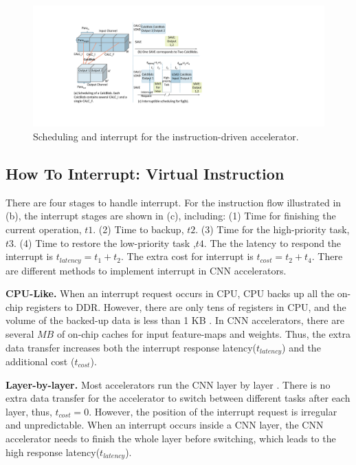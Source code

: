 \begin{figure}[t]
 \centering
	\includegraphics[width=0.99\linewidth]{fig/singlesave.pdf} 	
 \caption{
		Scheduling and interrupt for the instruction-driven accelerator.
 }
	\label{fig:singlesave}
\end{figure}

\subsection{How To Interrupt: Virtual Instruction}
\label{sec:howinter}

There are four stages to handle interrupt. For the instruction flow illustrated in (b), the interrupt stages are shown in (c), including: (1) Time for finishing the current operation, $t1$. (2) Time to backup, $t2$. (3) Time for the high-priority task, $t3$. (4) Time to restore the low-priority task ,$t4$. The the latency to respond the interrupt is $t_{latency} = t_1+t_2$. The extra cost for interrupt is $t_{cost}=t_2+t_4$. 
There are different methods to implement interrupt in CNN accelerators.

\textbf{CPU-Like.}
When an interrupt request occurs in CPU, CPU backs up all the on-chip registers to DDR. However, there are only tens of registers in CPU, and the volume of the backed-up data is less than 1 KB \cite{furber2000arm}. In CNN accelerators, there are several $MB$ of on-chip caches \cite{qiu2016going, guo2017angel} for input feature-maps and weights. 
Thus, the extra data transfer increases both the interrupt response latency($t_{latency}$) and the additional cost ($t_{cost}$).

\textbf{Layer-by-layer.}
Most accelerators run the CNN layer by layer \cite{qiu2016going,guo2017angel}. 
There is no extra data transfer for the accelerator to switch between different tasks after each layer, thus, $t_{cost}=0$. 
However, the position of the interrupt request is irregular and unpredictable. When an interrupt occurs inside a CNN layer, the CNN accelerator needs to finish the whole layer before switching, which leads to the high response latency($t_{latency}$).

